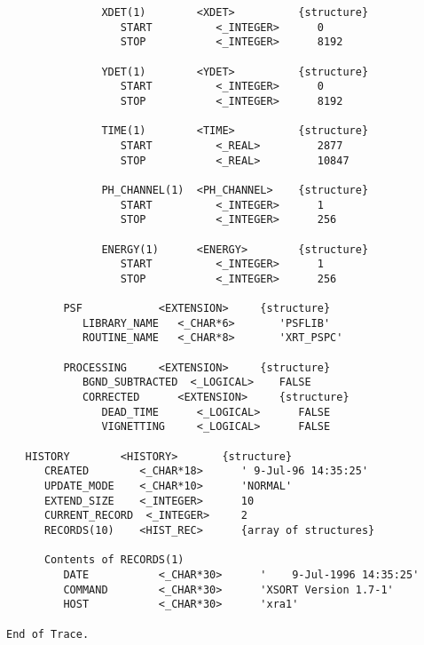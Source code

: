 \begin{verbatim}
               XDET(1)        <XDET>          {structure}
                  START          <_INTEGER>      0
                  STOP           <_INTEGER>      8192

               YDET(1)        <YDET>          {structure}
                  START          <_INTEGER>      0
                  STOP           <_INTEGER>      8192

               TIME(1)        <TIME>          {structure}
                  START          <_REAL>         2877
                  STOP           <_REAL>         10847

               PH_CHANNEL(1)  <PH_CHANNEL>    {structure}
                  START          <_INTEGER>      1
                  STOP           <_INTEGER>      256

               ENERGY(1)      <ENERGY>        {structure}
                  START          <_INTEGER>      1
                  STOP           <_INTEGER>      256

         PSF            <EXTENSION>     {structure}
            LIBRARY_NAME   <_CHAR*6>       'PSFLIB'
            ROUTINE_NAME   <_CHAR*8>       'XRT_PSPC'

         PROCESSING     <EXTENSION>     {structure}
            BGND_SUBTRACTED  <_LOGICAL>    FALSE
            CORRECTED      <EXTENSION>     {structure}
               DEAD_TIME      <_LOGICAL>      FALSE
               VIGNETTING     <_LOGICAL>      FALSE

   HISTORY        <HISTORY>       {structure}
      CREATED        <_CHAR*18>      ' 9-Jul-96 14:35:25'
      UPDATE_MODE    <_CHAR*10>      'NORMAL'
      EXTEND_SIZE    <_INTEGER>      10
      CURRENT_RECORD  <_INTEGER>     2
      RECORDS(10)    <HIST_REC>      {array of structures}

      Contents of RECORDS(1)
         DATE           <_CHAR*30>      '    9-Jul-1996 14:35:25'
         COMMAND        <_CHAR*30>      'XSORT Version 1.7-1'
         HOST           <_CHAR*30>      'xra1'

End of Trace.
\end{verbatim}
